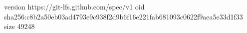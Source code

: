 version https://git-lfs.github.com/spec/v1
oid sha256:c8b2a50eb03ad4793e9c938f2d9b6f16e221fab681093c0622f9aea5e33d1f33
size 49248

